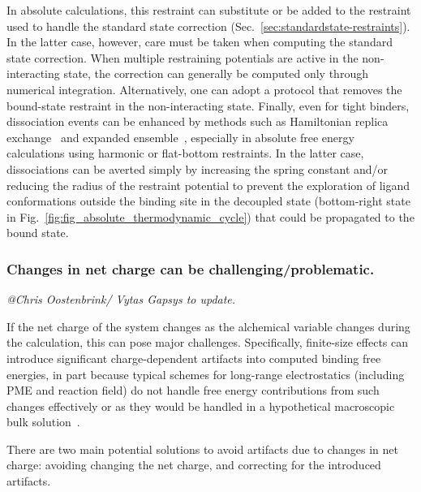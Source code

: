 \documentclass[9pt,bestpractices,pubversion]{livecoms}
\makeatletter
\newcommand{\tocsubsubsectioncomment}[1]{%
  \addtocontents{toc}{%
    {\leftskip \cftsubsecindent\relax
     \advance\leftskip \cftsubsubsecnumwidth\relax
     \rightskip \@tocrmarg\relax
     \textit{#1}\protect\par}}%
  \textit{#1}\par}
\makeatother
\begin{document}
In absolute calculations, this restraint can substitute or be added to the restraint used to handle the standard state correction (Sec.~\ref{sec:standardstate-restraints}).
In the latter case, however, care must be taken when computing the standard state correction.
When multiple restraining potentials are active in the non-interacting state, the correction can generally be computed only through numerical integration.
Alternatively, one can adopt a protocol that removes the bound-state restraint in the non-interacting state.
Finally, even for tight binders, dissociation events can be enhanced by methods such as Hamiltonian replica exchange~\cite{sugita2000multidimensional,chodera2011replica,wang2013identifying} and expanded ensemble~\cite{lyubartsev1992new,li2007simulated}, especially in absolute free energy calculations using harmonic or flat-bottom restraints.
In the latter case, dissociations can be averted simply by increasing the spring constant and/or reducing the radius of the restraint potential to prevent the exploration of ligand conformations outside the binding site in the decoupled state (bottom-right state in Fig.~\ref{fig:fig_absolute_thermodynamic_cycle}) that could be propagated to the bound state.

\subsubsection{Changes in net charge can be challenging/problematic.}
\tocsubsubsectioncomment{@Chris Oostenbrink/ Vytas Gapsys to update.}
If the net charge of the system changes as the alchemical variable changes during the  calculation, this can pose major challenges.
Specifically, finite-size effects can introduce significant charge-dependent artifacts into computed binding free energies, in part because typical schemes for long-range electrostatics (including PME and reaction field) do not handle free energy contributions from such changes effectively or as they would be handled in a hypothetical macroscopic bulk solution~\cite{lin2014overview, ohlknecht2020correcting, rocklin2013calculating}.

There are two main potential solutions to avoid artifacts due to changes in net charge: avoiding changing the net charge, and correcting for the introduced artifacts.
\end{document}
